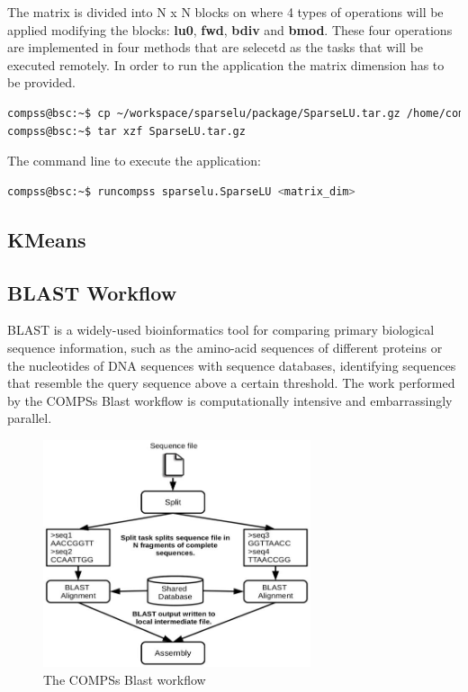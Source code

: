 The matrix is divided into N x N blocks on where 4 types of operations will be applied modifying the blocks: 
{\bf lu0}, {\bf fwd}, {\bf bdiv} and {\bf bmod}. These four operations are implemented in four methods that 
are selecetd as the tasks that will be executed remotely. In order to run the application the matrix dimension 
has to be provided.

\begin{lstlisting}[language=bash]
compss@bsc:~$ cp ~/workspace/sparselu/package/SparseLU.tar.gz /home/compss/
compss@bsc:~$ tar xzf SparseLU.tar.gz
\end{lstlisting}

The command line to execute the application:

\begin{lstlisting}[language=bash]
compss@bsc:~$ runcompss sparselu.SparseLU <matrix_dim>
\end{lstlisting}


\subsection{KMeans}


\subsection{BLAST Workflow}
BLAST is a widely-used bioinformatics tool for comparing primary biological sequence information, such as 
the amino-acid sequences of different proteins or the nucleotides of DNA sequences with sequence databases, 
identifying sequences that resemble the query sequence above a certain threshold. 
The work performed by the COMPSs Blast workflow is computationally intensive and embarrassingly parallel.

\begin{figure}[ht!]
  \centering
    \includegraphics[width=0.7\textwidth]{./Sections/2_Java/Figures/blast_workflow.jpeg}
    \caption{The COMPSs Blast workflow}
    \label{fig:BLAST_workflow}
\end{figure}

